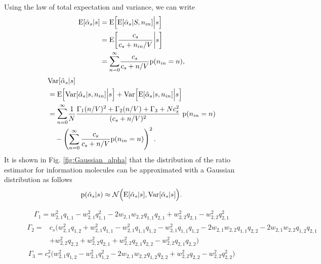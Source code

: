 \documentclass[twocolumn]{IEEEtran}
\newcommand{\p}{\mathrm{p}}
\newcommand{\E}{\mathrm{E}}
\newcommand{\Var}{\mathrm{Var}}
\newcounter{mytempeqncnt}
\begin{document}
Using the law of total expectation and variance, we can write
\begin{align}
\E[\hat{\alpha}_s|s] &=  \E\Bigl[\E[\hat{\alpha}_s|S, n_{in}]\Big|s\Bigr] \\ \nonumber
&= \E\biggl[\frac{c_s}{c_s + n_{in}/V} \bigg|s\biggr] \\ \nonumber
&= \mathlarger{\sum}_{n=0}^\infty \frac{c_s}{c_s + n/V} \p(n_{in} = n),
\end{align}
\begin{align}\label{eq:boundtimeMeanAndVariance}
&\Var[\hat{\alpha}_s|s] \\ \nonumber
&= \E\Bigl[\Var[\hat{\alpha}_s|s, n_{in}] \Big|s \Bigr] + \Var\Bigl[\E[\hat{\alpha}_s|s, n_{in}] \Big|s\Bigr] \\ \nonumber
&=  \mathlarger{\sum}_{n=0}^\infty \frac{1}{N} \frac{\Gamma_1 (n/V)^2 + \Gamma_2 (n/V) + \Gamma_3 + N c_s^2}{(c_s + n/V)^2} ~\p(n_{in} = n) \\ \nonumber
& ~~~- \left(\sum_{n=0}^\infty \frac{c_s}{c_s + n/V}  \p(n_{in} = n)\right)^2.
\end{align}
It is shown in Fig. \ref{fig:Gaussian_alpha} that the distribution of the ratio estimator for information molecules can be approximated with a Gaussian distribution as follows
\begin{equation}
\p(\hat{\alpha}_s|s) \approx \mathcal{N}\Bigl(\E[\hat{\alpha}_s|s] , \Var[\hat{\alpha}_s|s] \Bigr). \label{eq:DRBTpdf}
\end{equation}
\begin{figure*}[!t]
	\normalsize
	\setcounter{mytempeqncnt}{\value{equation}}
	\setcounter{equation}{31}
	\begin{align} \label{eq:Gamma1}
	\Gamma_1  = w_{2,1}^2 q_{1,1} - w_{2,1}^2 q_{1,1}^2 - 2 w_{2,1}w_{2,2}q_{1,1}q_{2,1} + w_{2,2}^2 q_{2,1} - w_{2,2}^2 q_{2,1}^2 
	\end{align}
	\begin{align} \label{eq:Gamma2}
	\Gamma_2  = & c_s  \bigl( w_{2,1}^2 q_{1,2} + w_{2,1}^2 q_{1,1}  - w_{2,1}^2 q_{1,1} q_{1,2} - w_{2,1}^2 q_{1,1} q_{1,2}  - 2 w_{2,1} w_{2,2} q_{1,1} q_{2,2}  - 2 w_{2,1} w_{2,2} q_{1,2} q_{2,1}  \\ \nonumber
	&+ w_{2,2}^2 q_{2,2}  + w_{2,2}^2 q_{2,1}   + w_{2,2}^2 q_{2,1} q_{2,2}  - w_{2,2}^2 q_{2,1} q_{2,2}\bigr)  
	\end{align}
	\begin{align} \label{eq:Gamma3}
	\Gamma_3  = c_s^2 \bigl(w_{2,1}^2 q_{1,2} - w_{2,1}^2 q_{1,2}^2 - 2 w_{2,1} w_{2,2} q_{1,2} q_{2,2} + w_{2,2}^2 q_{2,2} - w_{2,2}^2 q_{2,2}^2 \bigr) 
	\end{align}
	\setcounter{equation}{\value{mytempeqncnt}}
	\hrulefill
	\vspace*{4pt}
\end{figure*}
\end{document}
